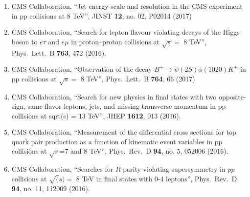 \begin{itemize}
\begin{enumerate}
\item CMS Collaboration, ``Jet energy scale and resolution in the CMS experiment in pp collisions at 8 TeV'', JINST {\bf 12}, no. 02, P02014 (2017)

\item CMS Collaboration, ``Search for lepton flavour violating decays of the Higgs boson to $e \tau$ and $e \mu$ in proton–proton collisions at $\sqrt s=$ 8 TeV'', Phys.\ Lett.\ B {\bf 763}, 472 (2016).

\item CMS Collaboration, ``Observation of the decay $B^+ \to \psi(2S) \phi(1020) K^+$ in pp collisions at $\sqrt s =$ 8 TeV'', Phys.\ Lett.\ B {\bf 764}, 66 (2017)

\item CMS Collaboration, ``Search for new physics in final states with two opposite-sign, same-flavor leptons, jets, and missing transverse momentum in pp collisions at sqrt(s) = 13 TeV'', JHEP {\bf 1612}, 013 (2016).

\item CMS Collaboration, ``Measurement of the differential cross sections for top quark pair production as a function of kinematic event variables in pp collisions at $\sqrt s$=7 and 8 TeV'', Phys.\ Rev.\ D {\bf 94}, no. 5, 052006 (2016).

\item CMS Collaboration, ``Searches for $R$-parity-violating supersymmetry in $pp $collisions at $\sqrt(s) =$ 8 TeV in final states with 0-4 leptons'', Phys.\ Rev.\ D {\bf 94}, no. 11, 112009 (2016).


\end{enumerate}
\end{itemize}
